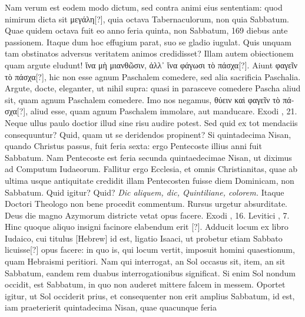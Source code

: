 Nam verum est eodem modo dictum, sed
contra animi eius sententiam: quod nimirum dicta sit \textgreek{μεγάλη[?]},
quia octava Tabernaculorum, non quia Sabbatum.
Quae quidem
octava fuit eo anno feria quinta, non Sabbatum, 169 diebus ante
passionem.
Itaque dum hoc effugium parat, suo se gladio iugulat.
Quis unquam tam obstinatos adversus veritatem animos credidisset?
Illam autem obiectionem quam argute eludunt!
 \textgreek{ἵνα μὴ μιανθῶσιν,
ἀλλ᾽ ἵνα φάγωσι τὸ πάσχα[?]}.
Aiunt \textgreek{φαγεῖν τὸ πάσχα[?]}, hic non esse
agnum Paschalem comedere, sed alia sacrificia Paschalia.
Argute, docte, eleganter, ut nihil supra: quasi in parasceve comedere
Pascha aliud sit, quam agnum Paschalem comedere.
Imo nos
negamus, \textgreek{θύειν καὶ φαγεῖν τὸ πάσχα[?]},
 aliud esse, quam agnum Paschalem
immolare, aut manducare.
Exodi , 21.
Neque ullus paulo doctior illud sine risu audire potest.
Sed quid ex tot mendaciis consequuntur?
Quid, quam ut se deridendos propinent?
Si quintadecima Nisan, quando Christus passus, fuit feria sexta:
 ergo Pentecoste
illius anni fuit Sabbatum.
Nam Pentecoste est feria secunda
quintaedecimae Nisan, ut diximus ad Computum Iudaeorum.
Fallitur ergo Ecclesia, et omnis Christianitas, quae ab ultima usque
 antiquitate
credidit illam Pentecosten fuisse diem Dominicam, non
Sabbatum.
Quid igitur?
Quid?
\textit{\emd{} Dic aliquem, dic, Quintiliane, colorem.}
Itaque Doctori Theologo non bene procedit commentum.
Rursus urgetur absurditate.
Deus die magno Azymorum districte
vetat opus facere.
Exodi , 16.
Levitici , 7.
Hinc quoque
aliquo insigni facinore elabendum erit [?].
Adducit locum ex libro Iudaico,
cui titulus \texthebrew{}[Hebrew] id est, ligatio Isaaci, ut probetur etiam
Sabbato licuisse[?] opus facere: in quo is, qui locum vertit, imposuit homini
quaestionum, quam Hebraismi peritiori.
Nam qui interrogat,
an Sol occasus sit, item, an sit Sabbatum, eandem rem duabus interrogationibus
significat.
%
Si enim Sol nondum occidit, est Sabbatum,
in quo non auderet mittere falcem in messem.
Oportet igitur,
ut Sol occiderit prius, et consequenter non erit amplius Sabbatum,
id est, iam praeterierit quintadecima Nisan, quae quacunque feria

